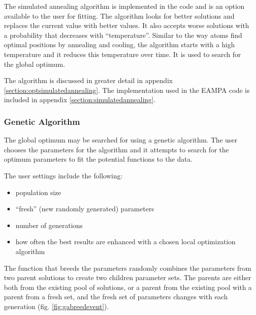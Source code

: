 The simulated annealing algorithm is implemented in the code and is an option available to the user for fitting.  The algorithm looks for better solutions and replaces the current value with better values.  It also accepts worse solutions with a probability that decreases with \enquote{temperature}.  Similar to the way atoms find optimal positions by annealing and cooling, the algorithm starts with a high temperature and it reduces this temperature over time.  It is used to search for the global optimum.

The algorithm is discussed in greater detail in appendix \ref{section:optsimulatedannealing}.  The implementation used in the EAMPA code is included in appendix \ref{section:simulatedannealing}.





\subsubsection{Genetic Algorithm}

The global optimum may be searched for using a genetic algorithm.  The user chooses the parameters for the algorithm and it attempts to search for the optimum parameters to fit the potential functions to the data.

The user settings include the following:

\begin{itemize}
\item population size
\item \enquote{fresh} (new randomly generated) parameters
\item number of generations
\item how often the best results are enhanced with a chosen local optimization algorithm
\end{itemize}

The function that breeds the parameters randomly combines the parameters from two parent solutions to create two children parameter sets.  The parents are either both from the existing pool of solutions, or a parent from the existing pool with a parent from a fresh set, and the fresh set of parameters changes with each generation (fig. \ref{fig:gabreedevent}).

